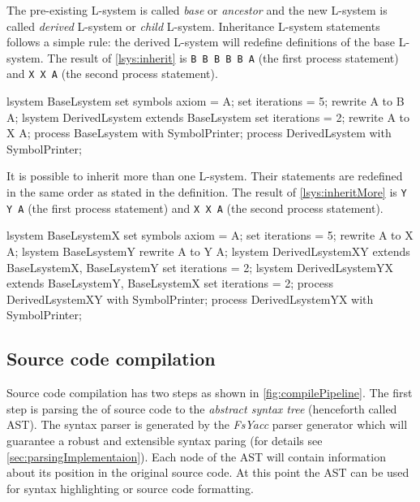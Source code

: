 The pre-existing L-system is called \emph{base} or \emph{ancestor} and the new L-system is called \emph{derived} L-system or \emph{child} L-system.
Inheritance L-system statements follows a simple rule: the derived L-system will redefine definitions of the base L-system.
The result of \autoref{lsys:inherit} is \texttt{B B B B B A} (the first process statement) and \texttt{X X A} (the second process statement).

\begin{Lsystem}[label=lsys:inherit,caption={Example \lsystems inheritance.}]
lsystem BaseLsystem {
	set symbols axiom = A;
	set iterations = 5;
	rewrite A to B A;
}
lsystem DerivedLsystem extends BaseLsystem {
	set iterations = 2;
	rewrite A to X A;
}
process BaseLsystem with SymbolPrinter;
process DerivedLsystem with SymbolPrinter;
\end{Lsystem}

It is possible to inherit more than one L-system.
Their statements are redefined in the same order as stated in the definition.
The result of \autoref{lsys:inheritMore} is \texttt{Y Y A} (the first process statement) and \texttt{X X A} (the second process statement).

\begin{Lsystem}[label=lsys:inheritMore,caption={Example of the array syntax.}]
lsystem BaseLsystemX {
	set symbols axiom = A;
	set iterations = 5;
	rewrite A to X A;
}
lsystem BaseLsystemY {
	rewrite A to Y A;
}
lsystem DerivedLsystemXY extends BaseLsystemX, BaseLsystemY {
	set iterations = 2;
}
lsystem DerivedLsystemYX extends BaseLsystemY, BaseLsystemX {
	set iterations = 2;
}
process DerivedLsystemXY with SymbolPrinter;
process DerivedLsystemYX with SymbolPrinter;
\end{Lsystem}


\subsection{Source code compilation}

Source code compilation has two steps as shown in \autoref{fig:compilePipeline}.
The first step is parsing the of source code to the \emph{abstract syntax tree} (henceforth called AST).
The syntax parser is generated by the \emph{FsYacc} parser generator which will guarantee a robust and extensible syntax paring (for details see \autoref{sec:parsingImplementaion}).
Each node of the AST will contain information about its position in the original source code.
At this point the AST can be used for syntax highlighting or source code formatting.

